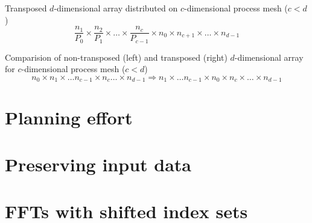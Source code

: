 Transposed $d$-dimensional array distributed on $c$-dimensional process mesh ($c<d$)
\begin{equation*}
  \frac{n_1}{P_0} \times \frac{n_2}{P_1} \times \hdots \times \frac{n_c}{P_{c-1}}  \times n_0 \times n_{c+1} \times \hdots \times n_{d-1}
\end{equation*}

Comparision of non-transposed (left) and transposed (right) $d$-dimensional array for $c$-dimensional process mesh ($c<d$)
\begin{equation*}
  n_0\times n_1\times \hdots n_{c-1} \times n_c \hdots \times n_{d-1} \Rightarrow n_1 \times \hdots n_{c-1} \times n_0 \times n_c \times \hdots \times n_{d-1}
\end{equation*}

\section{Planning effort}
\begin{compactitem}
  \item {}
  \item {}
  \item {}
  \item {}
  \item {}
  \item {}
\end{compactitem}


\section{Preserving input data}
\begin{compactitem}
  \item {}
  \item {}
  \item {}
\end{compactitem}

\section{FFTs with shifted index sets}
\begin{compactitem}
  \item {}
  \item {}
\end{compactitem}

